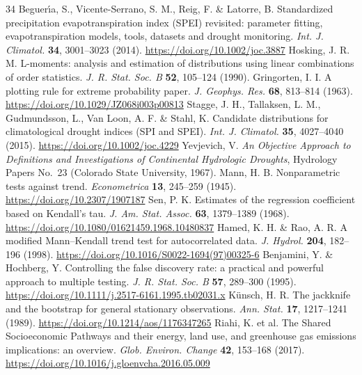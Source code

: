 \documentclass[11pt,a4paper]{article}
\begin{document}
\begin{thebibliography}{34}
 Beguer\'{\i}a, S., Vicente-Serrano, S. M., Reig, F. \& Latorre, B. Standardized precipitation evapotranspiration index (SPEI) revisited: parameter fitting, evapotranspiration models, tools, datasets and drought monitoring. \textit{Int. J. Climatol.} \textbf{34}, 3001--3023 (2014). \url{https://doi.org/10.1002/joc.3887}
 Hosking, J. R. M. L-moments: analysis and estimation of distributions using linear combinations of order statistics. \textit{J. R. Stat. Soc. B} \textbf{52}, 105--124 (1990).
 Gringorten, I. I. A plotting rule for extreme probability paper. \textit{J. Geophys. Res.} \textbf{68}, 813--814 (1963). \url{https://doi.org/10.1029/JZ068i003p00813}
 Stagge, J. H., Tallaksen, L. M., Gudmundsson, L., Van Loon, A. F. \& Stahl, K. Candidate distributions for climatological drought indices (SPI and SPEI). \textit{Int. J. Climatol.} \textbf{35}, 4027--4040 (2015). \url{https://doi.org/10.1002/joc.4229}
 Yevjevich, V. \textit{An Objective Approach to Definitions and Investigations of Continental Hydrologic Droughts}, Hydrology Papers No.~23 (Colorado State University, 1967).
 Mann, H. B. Nonparametric tests against trend. \textit{Econometrica} \textbf{13}, 245--259 (1945). \url{https://doi.org/10.2307/1907187}
 Sen, P. K. Estimates of the regression coefficient based on Kendall's tau. \textit{J. Am. Stat. Assoc.} \textbf{63}, 1379--1389 (1968). \url{https://doi.org/10.1080/01621459.1968.10480837}
 Hamed, K. H. \& Rao, A. R. A modified Mann--Kendall trend test for autocorrelated data. \textit{J. Hydrol.} \textbf{204}, 182--196 (1998). \url{https://doi.org/10.1016/S0022-1694(97)00325-6}
 Benjamini, Y. \& Hochberg, Y. Controlling the false discovery rate: a practical and powerful approach to multiple testing. \textit{J. R. Stat. Soc. B} \textbf{57}, 289--300 (1995). \url{https://doi.org/10.1111/j.2517-6161.1995.tb02031.x}
 K\"{u}nsch, H. R. The jackknife and the bootstrap for general stationary observations. \textit{Ann. Stat.} \textbf{17}, 1217--1241 (1989). \url{https://doi.org/10.1214/aos/1176347265}
 Riahi, K. et al. The Shared Socioeconomic Pathways and their energy, land use, and greenhouse gas emissions implications: an overview. \textit{Glob. Environ. Change} \textbf{42}, 153--168 (2017). \url{https://doi.org/10.1016/j.gloenvcha.2016.05.009}
\end{thebibliography}
\end{document}
